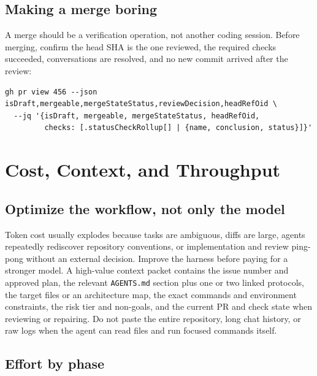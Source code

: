 \documentclass[11pt]{article}
\newcommand{\co}[1]{\lstinline[basicstyle=\ttfamily\color{gwInk}]{#1}}
\begin{document}
\subsection{Making a merge boring}

A merge should be a verification operation, not another coding session. Before merging, confirm
the head SHA is the one reviewed, the required checks succeeded, conversations are resolved, and
no new commit arrived after the review:

\begin{lstlisting}[style=gw]
gh pr view 456 --json isDraft,mergeable,mergeStateStatus,reviewDecision,headRefOid \
  --jq '{isDraft, mergeable, mergeStateStatus, headRefOid,
         checks: [.statusCheckRollup[] | {name, conclusion, status}]}'
\end{lstlisting}

\section{Cost, Context, and Throughput}

\subsection{Optimize the workflow, not only the model}

Token cost usually explodes because tasks are ambiguous, diffs are large, agents repeatedly
rediscover repository conventions, or implementation and review ping-pong without an external
decision. Improve the harness before paying for a stronger model. A high-value context packet
contains the issue number and approved plan, the relevant \co{AGENTS.md} section plus one or two
linked protocols, the target files or an architecture map, the exact commands and environment
constraints, the risk tier and non-goals, and the current PR and check state when reviewing or
repairing. Do not paste the entire repository, long chat history, or raw logs when the agent can
read files and run focused commands itself.

\subsection{Effort by phase}
\end{document}
